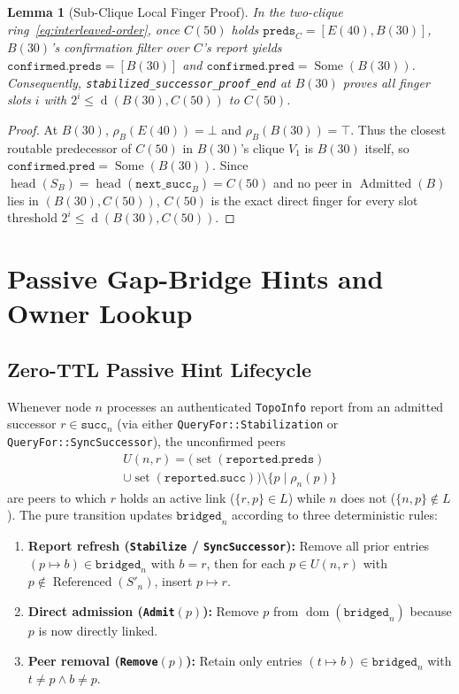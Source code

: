 \documentclass[journal]{IEEEtran}
\newtheorem{lemma}{Lemma}
\newcommand{\dist}{\operatorname{d}}
\newcommand{\Head}{\operatorname{head}}
\newcommand{\Admitted}{\operatorname{Admitted}}
\newcommand{\Referenced}{\operatorname{Referenced}}
\begin{document}
\begin{lemma}[Sub-Clique Local Finger Proof]
\label{lem:subclique-proof}
In the two-clique ring~\eqref{eq:interleaved-order}, once $C(50)$ holds
$\texttt{preds}_C = [E(40), B(30)]$, $B(30)$'s confirmation filter over $C$'s
report yields $\texttt{confirmed.preds} = [B(30)]$ and
$\texttt{confirmed.pred} = \operatorname{Some}(B(30))$. Consequently,
\texttt{stabilized\_successor\_proof\_end} at $B(30)$ proves all finger slots
$i$ with $2^i \le \dist(B(30), C(50))$ to $C(50)$.
\end{lemma}
\begin{proof}
At $B(30)$, $\rho_B(E(40)) = \bot$ and $\rho_B(B(30)) = \top$. Thus the closest
routable predecessor of $C(50)$ in $B(30)$'s clique $V_1$ is $B(30)$ itself, so
$\texttt{confirmed.pred} = \operatorname{Some}(B(30))$. Since $\Head(S_B) =
\Head(\texttt{next\_succ}_B) = C(50)$ and no peer in $\Admitted(B)$ lies in
$(B(30), C(50))$, $C(50)$ is the exact direct finger for every slot threshold
$2^i \le \dist(B(30), C(50))$.
\end{proof}

\section{Passive Gap-Bridge Hints and Owner Lookup}

\subsection{Zero-TTL Passive Hint Lifecycle}
Whenever node $n$ processes an authenticated \texttt{TopoInfo} report from an
admitted successor $r \in \texttt{succ}_n$ (via either
\texttt{QueryFor::Stabilization} or \texttt{QueryFor::SyncSuccessor}), the
unconfirmed peers
\begin{multline*}
  U(n, r) = \bigl(\operatorname{set}(\texttt{reported.preds}) \\
  \cup \operatorname{set}(\texttt{reported.succ})\bigr) \setminus
  \{p \mid \rho_n(p)\}
\end{multline*}
are peers to which $r$ holds an active link ($\{r, p\} \in L$) while $n$ does
not ($\{n, p\} \notin L$). The pure transition updates $\texttt{bridged}_n$
according to three deterministic rules:
\begin{enumerate}
  \item \textbf{Report refresh (\texttt{Stabilize} / \texttt{SyncSuccessor}):}
  Remove all prior entries $(p \mapsto b) \in \texttt{bridged}_n$ with $b = r$,
  then for each $p \in U(n, r)$ with $p \notin \Referenced(S'_n)$, insert
  $p \mapsto r$.
  \item \textbf{Direct admission (\texttt{Admit}$(p)$):} Remove $p$ from
  $\operatorname{dom}(\texttt{bridged}_n)$ because $p$ is now directly linked.
  \item \textbf{Peer removal (\texttt{Remove}$(p)$):} Retain only entries
  $(t \mapsto b) \in \texttt{bridged}_n$ with $t \neq p \land b \neq p$.
\end{enumerate}
\end{document}
